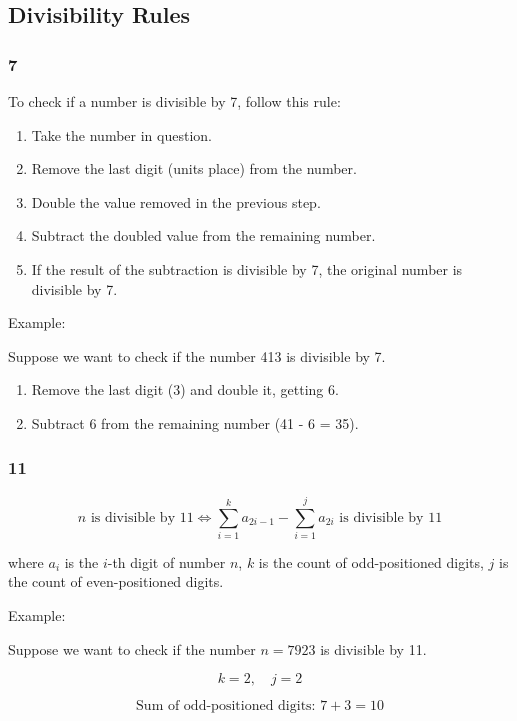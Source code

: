 \subsection{Divisibility Rules}

\subsubsection{7}

To check if a number is divisible by 7, follow this rule:

\begin{enumerate}
  \item Take the number in question.
  \item Remove the last digit (units place) from the number.
  \item Double the value removed in the previous step.
  \item Subtract the doubled value from the remaining number.
  \item If the result of the subtraction is divisible by 7, the original number is divisible by 7.
\end{enumerate}

Example:

Suppose we want to check if the number 413 is divisible by 7.

\begin{enumerate}
  \item Remove the last digit (3) and double it, getting 6.
  \item Subtract 6 from the remaining number (41 - 6 = 35).
\end{enumerate}

\subsubsection{11}

\[
n \text{ is divisible by 11} \iff \sum_{i=1}^{k} a_{2i-1} - \sum_{i=1}^{j} a_{2i} \text{ is divisible by 11}
\]

where \(a_{i}\) is the \(i\)-th digit of number \(n\), \(k\) is the count of odd-positioned digits, \(j\) is the count of even-positioned digits.

Example:

Suppose we want to check if the number \(n = 7923\) is divisible by 11.

\[
k = 2, \quad j = 2
\]

\[
\text{Sum of odd-positioned digits: } 7 + 3 = 10
\]

